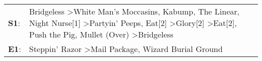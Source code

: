 \begin{supertabular}{p{0.03\textwidth}p{0.92\textwidth}}
 \textbf{S1}:  &  Bridgeless\textsuperscript{} \textgreater \enspace White Man's Moccasins\textsuperscript{}, \enspace Kabump\textsuperscript{}, \enspace The Linear\textsuperscript{}, \enspace Night Nurse[1]\textsuperscript{} \textgreater \enspace Partyin' Peeps\textsuperscript{}, \enspace Eat[2]\textsuperscript{} \textgreater \enspace Glory[2]\textsuperscript{} \textgreater \enspace Eat[2]\textsuperscript{}, \enspace Push the Pig\textsuperscript{}, \enspace Mullet (Over)\textsuperscript{} \textgreater \enspace Bridgeless\textsuperscript{}  \enspace  \\
 \textbf{E1}:  &                                                                                                                                                                                                                                                                                                                                                                                                           Steppin' Razor\textsuperscript{} \textgreater \enspace Mail Package\textsuperscript{}, \enspace Wizard Burial Ground\textsuperscript{}  \enspace  \\
\end{supertabular}
